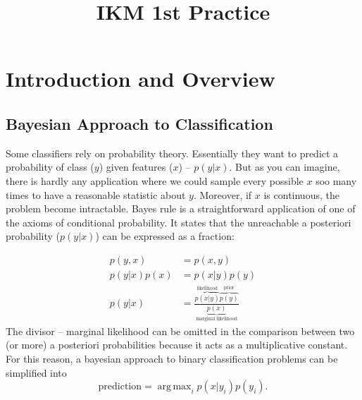 \documentclass{article}
\title{IKM 1st Practice}
\author{}
\date{}
\DeclareMathOperator*{\argmax}{arg\,max}
\begin{document}
\maketitle

\section{Introduction and Overview}

\subsection{Bayesian Approach to Classification}
Some classifiers rely on probability theory. 
Essentially they want to predict a probability of class ($y$) given features ($x$) -- $p(y|x)$. 
But as you can imagine, there is hardly any application where we could sample every possible $x$ soo many times to have a reasonable statistic about $y$. 
Moreover, if $x$ is continuous, the problem become intractable.
Bayes rule is a straightforward application of one of the axioms of conditional probability. 
It states that the unreachable a posteriori probability ($p(y|x)$) can be expressed as a fraction:

\begin{align}
    p(y, x) &= p(x, y) \\
    p(y | x) p(x) &= p(x|y) p(y) \\
    p(y | x) &= \frac{
        \overbrace{p(x | y)}^{\text{likelihood}} 
        \overbrace{p(y)}^{\text{prior}}}{
        \underbrace{p(x)}_{\text{marginal likelihood}}
    }
\end{align}
The divisor -- marginal likelihood can be omitted in the comparison between two (or more) a posteriori probabilities because it acts as a multiplicative constant.
For this reason, a bayesian approach to binary classification problems can be simplified into
\begin{equation}
    \label{eq:cls}
    \text{prediction} = \argmax_i p(x|y_i) p(y_i).
\end{equation}
\end{document}

